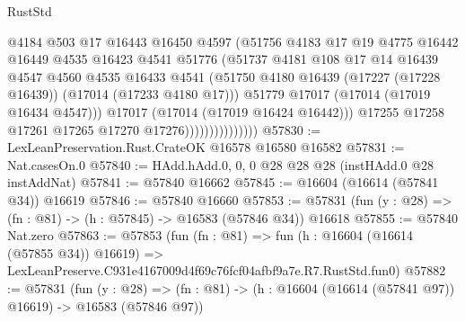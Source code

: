 \begin{lexlean}{RustStd}
\begin{coremodule}
                                  @4184
                                  @503
                                  @17
                                  @16443
                                  @16450
                                  @4597
                                  (@51756
                                    @4183
                                    @17
                                    @19
                                    @4775
                                    @16442
                                    @16449
                                    @4535
                                    @16423
                                    @4541
                                    @51776
                                    (@51737
                                      @4181
                                      @108
                                      @17
                                      @14
                                      @16439
                                      @4547
                                      @4560
                                      @4535
                                      @16433
                                      @4541
                                      (@51750
                                        @4180
                                        @16439
                                        (@17227 (@17228 @16439))
                                        (@17014 (@17233 @4180 @17)))
                                      @51779
                                      @17017
                                      (@17014 (@17019 @16434 @4547)))
                                    @17017
                                    (@17014 (@17019 @16424 @16442)))
                                  @17255
                                  @17258
                                  @17261
                                  @17265
                                  @17270
                                  @17276)))))))))))))))
@57830 := LexLeanPreservation.Rust.CrateOK @16578 @16580 @16582
@57831 := Nat.casesOn.{0}
@57840 := HAdd.hAdd.{0, 0, 0} @28 @28 @28 (instHAdd.{0} @28 instAddNat)
@57841 := @57840 @16662
@57845 := @16604 (@16614 (@57841 @34)) @16619
@57846 := @57840 @16660
@57853 := @57831 (fun (y : @28) => (fn : @81) -> (h : @57845) -> @16583 (@57846 @34)) @16618
@57855 := @57840 Nat.zero
@57863 := @57853
    (fun (fn : @81) =>
    fun (h : @16604 (@16614 (@57855 @34)) @16619) =>
    LexLeanPreserve.C931e4167009d4f69c76fcf04afbf9a7e.R7.RustStd.fun0)
@57882 := @57831
    (fun (y : @28) =>
    (fn : @81) -> (h : @16604 (@16614 (@57841 @97)) @16619) -> @16583 (@57846 @97))

\end{coremodule}
\end{lexlean}
